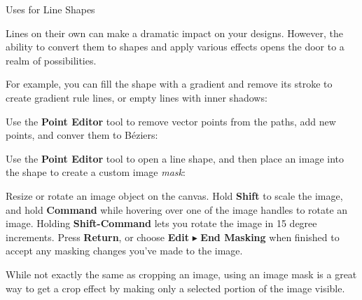 \documentclass[../main.tex]{subfiles}
\begin{document}
\begin{ogsidebar}

  Uses for Line Shapes

  Lines on their own can make a dramatic impact on your designs. However, the ability to convert
  them to shapes and apply various effects opens the door to a realm of possibilities.

  For example, you can fill the shape with a gradient and remove its stroke to create gradient
  rule lines, or empty lines with inner shadows:


  Use the \textbf{Point Editor} tool to remove vector points from the paths, add new points, and
  conver them to Béziers:


  Use the \textbf{Point Editor} tool to open a line shape, and then place an image into the
  shape to create a custom image \textit{mask}:

\end{ogsidebar}

\begin{description}[style=nextline]
  \item[{Mask Image/End Masking}] Resize or rotate an image object on the canvas. Hold
    \textbf{Shift} to scale the image, and hold \textbf{Command} while hovering over one of the
    image handles to rotate an image. Holding \textbf{Shift-Command} lets you rotate the image
    in 15 degree increments. Press \textbf{Return}, or choose \textbf{Edit}
    $\blacktriangleright$ \textbf{End Masking} when finished to accept any masking changes
    you've made to the image.
\end{description}

\begin{ogtip}
  While not exactly the same as cropping an image, using an image mask is a great way to get a
  crop effect by making only a selected portion of the image visible.
\end{ogtip}
\end{document}
